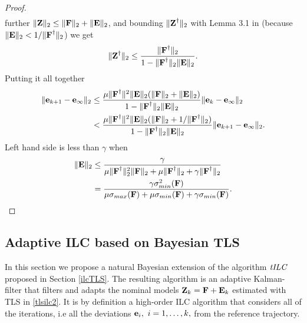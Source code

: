 \begin{proof}
\begin{align}
\end{align}
%
further $\|\boldsymbol{\mathrm{Z}}\|_2 \leq \|\boldsymbol{\mathrm{F}}\|_2 + \|\boldsymbol{\mathrm{E}}\|_2$, and bounding $\|\boldsymbol{\mathrm{Z}}^{\dagger}\|_2$ with Lemma 3.1 in \cite{Wedin73} (because $\|\boldsymbol{\mathrm{E}}\|_2 < 1/\|\boldsymbol{\mathrm{F}}^{\dagger}\|_2$) we get
%
\begin{align}
\|\boldsymbol{\mathrm{Z}}^{\dagger}\|_2 \leq \frac{\|\boldsymbol{\mathrm{F}}^{\dagger}\|_2}{1 - \|\boldsymbol{\mathrm{F}}^{\dagger}\|_2\|\boldsymbol{\mathrm{E}}\|_2}.
\end{align}
%
Putting it all together
%
\begin{align}
\|\boldsymbol{\mathrm{e}}_{k+1} - \boldsymbol{\mathrm{e}}_{\infty}\|_2 &\leq \frac{\mu \|\boldsymbol{\mathrm{F}}^{\dagger}\|^{2}\|\boldsymbol{\mathrm{E}}\|_2(\|\boldsymbol{\mathrm{F}}\|_2 + \|\boldsymbol{\mathrm{E}}\|_2)}{1 - \|\boldsymbol{\mathrm{F}}^{\dagger}\|_2\|\boldsymbol{\mathrm{E}}\|_2}\|\boldsymbol{\mathrm{e}}_{k} - \boldsymbol{\mathrm{e}}_{\infty}\|_2 \\
&<  \frac{\mu \|\boldsymbol{\mathrm{F}}^{\dagger}\|^{2}\|\boldsymbol{\mathrm{E}}\|_2(\|\boldsymbol{\mathrm{F}}\|_2 + 1/\|\boldsymbol{\mathrm{F}}^{\dagger}\|_2)}{1 - \|\boldsymbol{\mathrm{F}}^{\dagger}\|_2\|\boldsymbol{\mathrm{E}}\|_2}\|\boldsymbol{\mathrm{e}}_{k+1} - \boldsymbol{\mathrm{e}}_{\infty}\|_2.
\end{align}
%
Left hand side is less than $\gamma$ when
%
\begin{align}
\|\boldsymbol{\mathrm{E}}\|_2 &\leq \frac{\gamma}{\mu\|\boldsymbol{\mathrm{F}}^{\dagger}\|_2^{2}\|\boldsymbol{\mathrm{F}}\|_2 + \mu\|\boldsymbol{\mathrm{F}}^{\dagger}\|_2 + \gamma\|\boldsymbol{\mathrm{F}}^{\dagger}\|_2} \\
&= \frac{\gamma\sigma_{min}^{2}(\boldsymbol{\mathrm{F}})}{\mu\sigma_{max}(\boldsymbol{\mathrm{F}}) + \mu\sigma_{min}(\boldsymbol{\mathrm{F}}) + \gamma\sigma_{min}(\boldsymbol{\mathrm{F}})}.
\end{align}

%
\end{proof}
%
%

\subsection{Adaptive ILC based on Bayesian TLS}\label{adaptiveILC}

In this section we propose a natural Bayesian extension of the algorithm $\emph{tILC}$ proposed in Section \ref{ilcTLS}. The resulting algorithm is an adaptive Kalman-filter that filters and adapts the nominal models $\boldsymbol{\mathrm{Z}}_k = \boldsymbol{\mathrm{F}} + \boldsymbol{\mathrm{E}}_k$ estimated with TLS in \eqref{tlsilc2}. It is by definition a high-order ILC algorithm that considers all of the iterations, i.e all the deviations $\boldsymbol{\mathrm{e}}_i, \ i = 1, \ldots, k,$ from the reference trajectory. 


